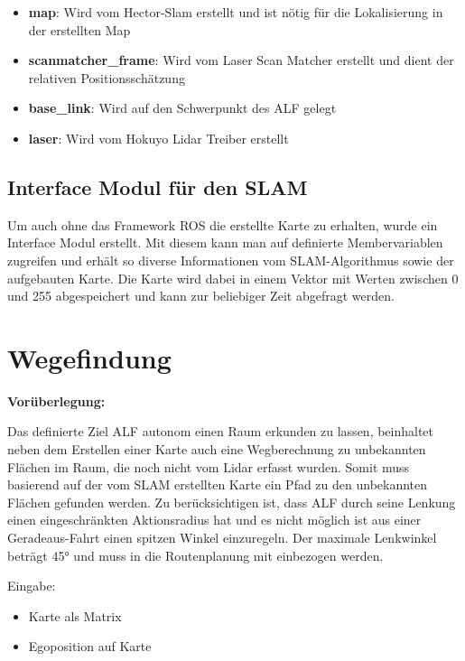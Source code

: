 \begin{itemize}
\item \textbf{map}: Wird vom Hector-Slam erstellt und ist nötig für die Lokalisierung in der erstellten Map
\item \textbf{scanmatcher\_frame}: Wird vom Laser Scan Matcher erstellt und dient der relativen Positionsschätzung
\item \textbf{base\_link}: Wird auf den Schwerpunkt des ALF gelegt
\item \textbf{laser}: Wird vom Hokuyo Lidar Treiber erstellt
\end{itemize}



\subsection{Interface Modul für den SLAM}

Um auch ohne das Framework ROS die erstellte Karte zu erhalten, wurde ein Interface Modul erstellt. Mit diesem kann man auf definierte Membervariablen zugreifen und erhält so diverse Informationen vom SLAM-Algorithmus sowie der aufgebauten Karte. Die Karte wird dabei in einem Vektor mit Werten zwischen 0 und 255 abgespeichert und kann zur beliebiger Zeit abgefragt werden. 













\section{Wegefindung}

\textbf{Vorüberlegung:}

Das definierte Ziel ALF autonom einen Raum erkunden zu lassen, beinhaltet neben dem Erstellen einer Karte auch eine Wegberechnung zu unbekannten Flächen im Raum, die noch nicht vom Lidar erfasst wurden. Somit muss basierend auf der vom SLAM erstellten Karte ein Pfad zu den unbekannten Flächen gefunden werden.
Zu berücksichtigen ist, dass ALF durch seine Lenkung einen eingeschränkten Aktionsradius hat und es nicht möglich ist aus einer Geradeaus-Fahrt einen spitzen Winkel einzuregeln. Der maximale Lenkwinkel beträgt 45° und muss in die Routenplanung mit einbezogen werden. 

Eingabe: 
\begin{itemize}
\item Karte als Matrix
\item Egoposition auf Karte
\end{itemize}


